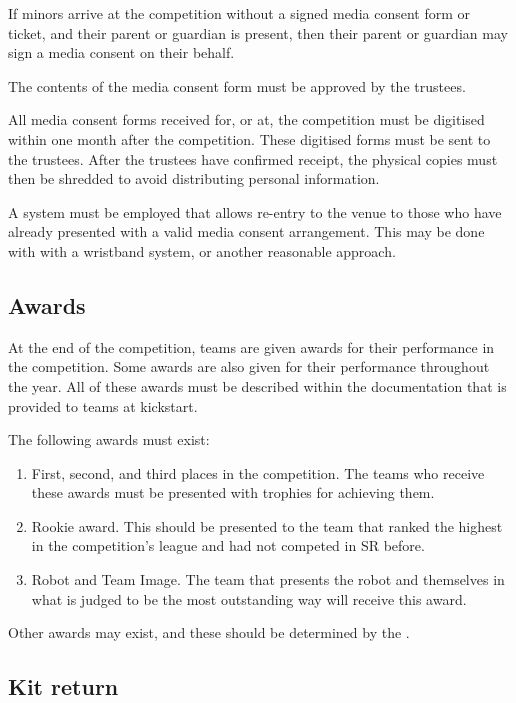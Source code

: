 If minors arrive at the competition without a signed media consent form or ticket, and their parent or guardian is present, then their parent or guardian may sign a media consent on their behalf.

The contents of the media consent form must be approved by the trustees.

All media consent forms received for, or at, the competition must be digitised within one month after the competition.  These digitised forms must be sent to the trustees.  After the trustees have confirmed receipt, the physical copies must then be shredded to avoid distributing personal information.

A system must be employed that allows re-entry to the venue to those who have already presented with a valid media consent arrangement.  This may be done with with a wristband system, or another reasonable approach.

\subsection{Awards}

At the end of the competition, teams are given awards for their performance in the competition.  Some awards are also given for their performance throughout the year.  All of these awards must be described within the documentation that is provided to teams at kickstart.

The following awards must exist:
\begin{enumerate}
\item First, second, and third places in the competition.  The teams who receive these awards must be presented with trophies for achieving them.

\item Rookie award.  This should be presented to the team that ranked the highest in the competition's league and had not competed in SR before.

\item Robot and Team Image.  The team that presents the robot and themselves in what is judged to be the most outstanding way will receive this award.
\end{enumerate}
Other awards may exist, and these should be determined by the .

\subsection{Kit return}

